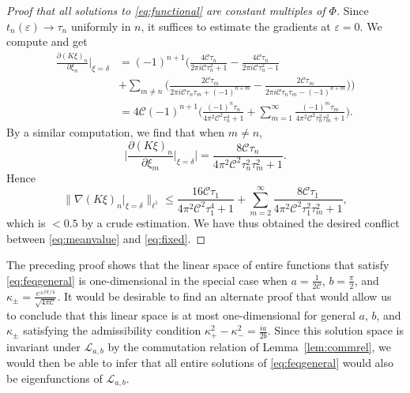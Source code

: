 \documentclass[12pt]{amsart}
\theoremstyle{plain}
\numberwithin{equation}{section}
\theoremstyle{definition}
\newcommand{\Cone}{\mathscr{C}}
\begin{document}
\begin{proof}[Proof that all solutions to \eqref{eq:functional} are  constant multiples of $\Phi$]
Since $t_n(\varepsilon) \to \tau_n$ uniformly in $n$, it suffices to estimate the gradients at $\varepsilon=0$. We compute and get
\begin{align*} \frac{\partial (K\xi)_n}{\partial \xi_n}\big|_{\xi=\delta} & = (-1)^{n+1} \Bigg( \frac{4 \mathscr{C} \tau_n }{2\pi i \mathscr{C} \tau_n^2+1} - \frac{4 \mathscr{C} \tau_n }{2\pi i \mathscr{C} \tau_n^2-1}\\
	& + \sum_{m\neq n} \Big( \frac{2 \mathscr{C} \tau_m }{2\pi i \mathscr{C} \tau_n\tau_m+(-1)^{n+m}} - \frac{2 \mathscr{C} \tau_m }{2\pi i \mathscr{C} \tau_n\tau_m-(-1)^{n+m}}\Big)\Bigg) \\
	& = 4\mathscr{C}(-1)^{n+1} \Bigg( \frac{(-1)^n \tau_n }{4\pi^2 \mathscr{C}^2 \tau_n^4+1}
	+ \sum_{m=1}^\infty \frac{(-1)^m \tau_m }{4\pi^2 \mathscr{C}^2 \tau_n^2\tau_m^2+1} \Bigg).
\end{align*}
By a similar computation, we find that when $m\neq n$,
\[ \Big|\frac{\partial (K\xi)_n}{\partial \xi_m}\big|_{\xi=\delta}\Big| = \frac{8 \mathscr{C}\tau_n}{4\pi^2 \mathscr{C}^2\tau_n^2\tau_m^2+1}    . \]
Hence
\[ \big\| \nabla (K \xi)_n \big|_{\xi=\delta} \big\|_{\ell^1} \le \frac{16 \mathscr{C}\tau_1}{4\pi^2 \mathscr{C}^2 \tau_1^4+1} +\sum_{m=2}^\infty  \frac{8 \mathscr{C}\tau_1}{4\pi^2 \mathscr{C}^2\tau_1^2\tau_m^2+1}, \]
which is $<0.5$ by a crude estimation. We have thus obtained the desired conflict between \eqref{eq:meanvalue} and \eqref{eq:fixed}.
 \end{proof}

The preceding proof shows that the linear space of
entire functions that satisfy \eqref{eq:feqgeneral} is one-dimensional in the special case when $a=\frac{1}{2\Cone}$, $b=\frac{\pi}{2}$, and $\kappa_{\pm}=\frac{e^{\pm i\pi/4}}{\sqrt{4\pi \Cone}}$. 
It would be desirable to find an alternate proof that would allow us to conclude that this linear space is at most one-dimensional for general $a$, $b$, and $\kappa_\pm$ satisfying the admissibility condition  $\kappa_+^2-\kappa_-^2=\frac{ia}{2b}$. Since this solution space is invariant under $\mathcal{L}_{a,b}$ by the commutation relation of Lemma~\ref{lem:commrel}, we would then be able to infer that all entire solutions of \eqref{eq:feqgeneral} would also be eigenfunctions of $\mathcal{L}_{a,b}$.
\end{document}

